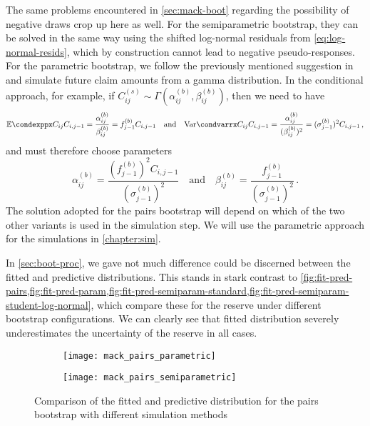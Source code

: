 \documentclass[a4paper]{book}
\begin{document}
The same problems encountered in \cref{sec:mack-boot} regarding the possibility of negative draws crop up here as well. For the semiparametric bootstrap, they can be solved in the same way using the shifted log-normal residuals from \cref{eq:log-normal-resids}, which by construction cannot lead to negative pseudo-responses.  For the parametric bootstrap, we follow the previously mentioned suggestion in \cite{england:dist} and simulate future claim amounts from a gamma distribution. In the conditional approach, for example, if $C^{(s)}_{ij} \sim \Gamma(\alpha^{(b)}_{ij}, \beta^{(b)}_{ij})$, then we need to have
\begin{equation}
  \condexpp{C_{ij}}{C_{i, j - 1}} = \frac{\alpha^{(b)}_{ij}}{\beta^{(b)}_{ij}} = f^{(b)}_{j-1} C_{i, j-1} \quad \text{and} \quad \condvarr{C_{ij}}{C_{i, j - 1}} = \frac{\alpha^{(b)}_{ij}}{(\beta^{(b)}_{ij})^2} = (\sigma^{(b)}_{j-1})^2 C_{i, j-1} \,,
\end{equation}
and must therefore choose parameters
\begin{equation} \label{eq:gamma-sim}
  \alpha^{(b)}_{ij} = \frac{(f^{(b)}_{j-1})^2 C_{i, j-1}}{(\sigma^{(b)}_{j-1})^2} \quad \text{and} \quad \beta^{(b)}_{ij} = \frac{f^{(b)}_{j-1}}{(\sigma^{(b)}_{j-1})^2} \,.
\end{equation}
The solution adopted for the pairs bootstrap will depend on which of the two other variants is used in the simulation step. We will use the parametric approach for the simulations in \cref{chapter:sim}.

In \cref{sec:boot-proc}, we gave not much difference could be discerned between the fitted and predictive distributions. This stands in stark contrast to \cref{fig:fit-pred-pairs,fig:fit-pred-param,fig:fit-pred-semiparam-standard,fig:fit-pred-semiparam-student-log-normal}, which compare these for the reserve under different bootstrap configurations. We can clearly see that fitted distribution severely underestimates the uncertainty of the reserve in all cases.

\begin{figure}[!p]
  \begin{subfigure}{0.45 \textwidth}
    \texttt{[image: mack\_pairs\_parametric]}
  \end{subfigure}
  \begin{subfigure}{0.45 \textwidth}
    \texttt{[image: mack\_pairs\_semiparametric]}
  \end{subfigure}
  \caption{Comparison of the fitted and predictive distribution for the pairs bootstrap with different simulation methods}
  \label{fig:fit-pred-pairs}
\end{figure}
\end{document}

